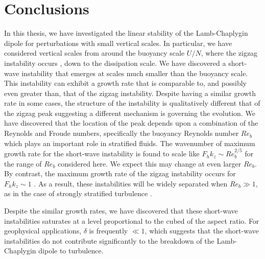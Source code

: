 \chapter{Conclusions}

In this thesis, we have investigated the linear stability of the Lamb-Chaplygin dipole for perturbations with small vertical scales. In particular, we have considered vertical scales from around the buoyancy scale $U/N$, where the zigzag instability occurs \cite{bc2000c,bc2001,waitebartello2004,waite2011}, down to the dissipation scale. We have discovered a short-wave instability that emerges at scales much smaller than the buoyancy scale. This instability can exhibit a growth rate that is comparable to, and possibly even greater than, that of the zigzag instability. Despite having a similar growth rate in some cases, the structure of the instability is qualitatively different that of the zigzag peak suggesting a different mechanism is governing the evolution.  We have discovered that the location of the peak depends upon a combination of the Reynolds and Froude numbers, specifically the buoyancy Reynolds number $Re_{b}$ which plays an important role in stratified fluids. The wavenumber of maximum growth rate for the short-wave instability is found to scale like $F_{h}k_{z}\sim Re_{b}^{2/5}$ for the range of $Re_{b}$ considered here. We expect this may change at even larger $Re_{b}$. By contrast, the maximum growth rate of the zigzag instability occurs for $F_{h}k_{z}\sim 1$ \cite{bc2000b}. As a result, these instabilities will be widely separated when $Re_{b}\gg 1$, as in the case of strongly stratified turbulence \cite{brethouwer2007}.

Despite the similar growth rates, we have discovered that these short-wave instabilities saturates at a level proportional to the cubed of the aspect ratio. For geophysical applications, $\delta$ is frequently $\ll 1$, which suggests that the short-wave instabilities do not contribute significantly to the breakdown of the Lamb-Chaplygin dipole to turbulence.

